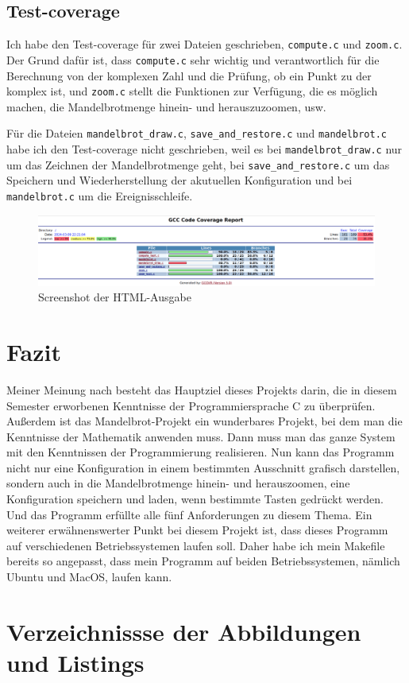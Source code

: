 \documentclass[ngerman,12pt,a4paper,titlepage]{article}
\begin{document}
\subsection{Test-coverage}
\begin{sloppypar}
Ich habe den Test-coverage für zwei Dateien geschrieben, \texttt{compute.c} und \texttt{zoom.c}.
Der Grund dafür ist, dass \texttt{compute.c} sehr wichtig und verantwortlich für die Berechnung von der komplexen Zahl und die Prüfung, ob ein Punkt zu der komplex ist, und \texttt{zoom.c} stellt die Funktionen zur Verfügung, die es möglich machen, die Mandelbrotmenge hinein- und herauszuzoomen, usw.

Für die Dateien \texttt{mandelbrot\_draw.c}, \texttt{save\_and\_restore.c} und \texttt{mandelbrot.c}  habe ich den Test-coverage nicht geschrieben, weil es bei \texttt{mandelbrot\_draw.c} nur um das Zeichnen der Mandelbrotmenge geht, bei \texttt{save\_and\_restore.c} um das Speichern und Wiederherstellung der akutuellen Konfiguration und bei \texttt{mandelbrot.c} um die Ereignisschleife.

\begin{figure}[H]
	\centering
	\includegraphics[width=1.0\linewidth]{Test-coverage}
	\caption[Test-coverage]{Screenshot der HTML-Ausgabe}
	\label{fig:Test-coverage}
\end{figure}
\end{sloppypar}

\section{Fazit}
Meiner Meinung nach besteht das Hauptziel dieses Projekts darin, die in diesem Semester erworbenen Kenntnisse der Programmiersprache C zu überprüfen. Außerdem ist das Mandelbrot-Projekt ein wunderbares Projekt, bei dem man die Kenntnisse der Mathematik anwenden muss. Dann muss man das ganze System mit den Kenntnissen der Programmierung realisieren. Nun kann das Programm nicht nur eine Konfiguration in einem bestimmten Ausschnitt grafisch darstellen, sondern auch in die Mandelbrotmenge hinein- und herauszoomen, eine Konfiguration speichern und laden, wenn bestimmte Tasten gedrückt werden. Und das Programm erfüllte alle fünf Anforderungen zu diesem Thema.  Ein weiterer erwähnenswerter Punkt bei diesem Projekt ist, dass dieses Programm auf verschiedenen Betriebssystemen laufen soll. Daher habe ich mein Makefile bereits so angepasst, dass mein Programm auf beiden Betriebssystemen, nämlich Ubuntu und MacOS, laufen kann.
\section{Verzeichnissse der Abbildungen und Listings}
\listoffigures
\listoflistings
\end{document}
